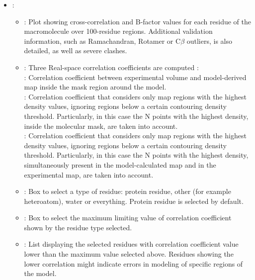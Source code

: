 \begin{itemize}
\begin{itemize}
        \begin{itemize}
         \item {}: 
         \begin{itemize}
          \item {}: Plot showing cross-correlation and B-factor values for each residue of the macromolecule over 100-residue regions. Additional validation information, such as Ramachandran, Rotamer or C{$\beta$} outliers, is also detailed, as well as severe clashes.  
          \item {}: Three Real-space correlation coefficients are computed \citep{afonine2018b}: \setlength{\parindent}{12pt}\\
          
           : Correlation coefficient between experimental volume and model-derived map inside the mask region around the model.\\
           
           : Correlation coefficient that considers only map regions with the highest density values, ignoring regions below a certain contouring density threshold. Particularly, in this case the N points with the highest density, inside the molecular mask, are taken into account.\\
           
           : Correlation coefficient that considers only map regions with the highest density values, ignoring regions below a certain contouring density threshold. Particularly, in this case the N points with the highest density, simultaneously present in the model-calculated map and in the experimental map, are taken into account.\\

          \item {}: Box to select a type of residue: protein residue, other (for example heteroatom), water or everything. Protein residue is selected by default.
          \item {}: Box to select the maximum limiting value of correlation coefficient shown by the residue type selected. 
          \item {}: List displaying the selected residues with correlation coefficient value lower than the maximum value selected above. Residues showing the lower correlation might indicate errors in modeling of specific regions of the model.
         \end{itemize}
         

\end{itemize}
\end{itemize}
\end{itemize}
